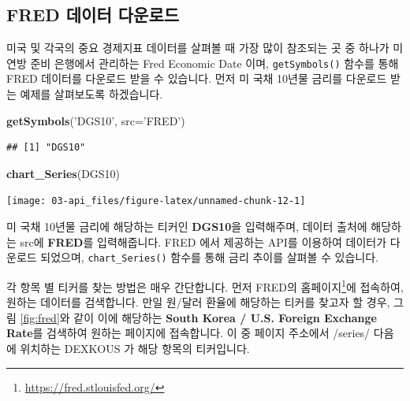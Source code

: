 \documentclass[12pt,]{book}
\newenvironment{Shaded}{\begin{snugshade}}{\end{snugshade}}
\newcommand{\DataTypeTok}[1]{\textcolor[rgb]{0.13,0.29,0.53}{#1}}
\newcommand{\KeywordTok}[1]{\textcolor[rgb]{0.13,0.29,0.53}{\textbf{#1}}}
\newcommand{\NormalTok}[1]{#1}
\newcommand{\StringTok}[1]{\textcolor[rgb]{0.31,0.60,0.02}{#1}}
\let\rmarkdownfootnote\footnote%
\def\footnote{\protect\rmarkdownfootnote}
\begin{document}
\hypertarget{fred--}{%
\subsection{FRED 데이터 다운로드}\label{fred--}}

미국 및 각국의 중요 경제지표 데이터를 살펴볼 때 가장 많이 참조되는 곳 중 하나가 미 연방 준비 은행에서 관리하는 Fred Economic Date 이며, \texttt{getSymbols()} 함수를 통해 FRED 데이터를 다운로드 받을 수 있습니다. 먼저 미 국채 10년물 금리를 다운로드 받는 예제를 살펴보도록 하겠습니다.

\begin{Shaded}
\begin{Highlighting}[]
\KeywordTok{getSymbols}\NormalTok{(}\StringTok{'DGS10'}\NormalTok{, }\DataTypeTok{src=}\StringTok{'FRED'}\NormalTok{)}
\end{Highlighting}
\end{Shaded}

\begin{verbatim}
## [1] "DGS10"
\end{verbatim}

\begin{Shaded}
\begin{Highlighting}[]
\KeywordTok{chart_Series}\NormalTok{(DGS10)}
\end{Highlighting}
\end{Shaded}

\begin{center}\texttt{[image: 03-api\_files/figure-latex/unnamed-chunk-12-1]} \end{center}

미 국채 10년물 금리에 해당하는 티커인 \textbf{DGS10}을 입력해주며, 데이터 출처에 해당하는 src에 \textbf{FRED}를 입력해줍니다. FRED 에서 제공하는 API를 이용하여 데이터가 다운로드 되었으며, \texttt{chart\_Series()} 함수를 통해 금리 추이를 살펴볼 수 있습니다.

각 항목 별 티커를 찾는 방법은 매우 간단합니다. 먼저 FRED의 홈페이지\footnote{\url{https://fred.stlouisfed.org/}}에 접속하여, 원하는 데이터를 검색합니다. 만일 원/달러 환율에 해당하는 티커를 찾고자 할 경우, 그림 \ref{fig:fred}와 같이 이에 해당하는 \textbf{South Korea / U.S. Foreign Exchange Rate}를 검색하여 원하는 페이지에 접속합니다. 이 중 페이지 주소에서 /series/ 다음에 위치하는 DEXKOUS 가 해당 항목의 티커입니다.
\end{document}
